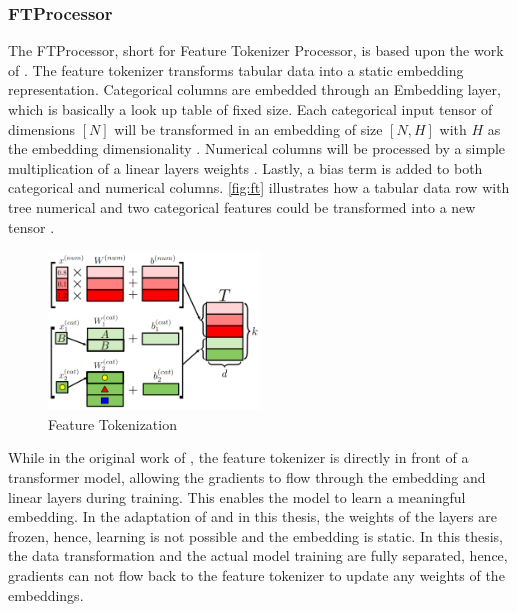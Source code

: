 \subsubsection*{FTProcessor}
\label{ch:FTProcessor}

The FTProcessor, short for Feature Tokenizer Processor, is based upon the work of \cite{zheng2022DiffusionModelsMissing, gorishniy2021RevisitingDeepLearning}.
The feature tokenizer transforms tabular data into a static embedding representation.
Categorical columns are embedded through an Embedding layer, which is basically a look up table \cite{EmbeddingPyTorch13} of fixed size.
Each categorical input tensor of dimensions $[N]$ will be transformed in an embedding of size $[N,H]$ with $H$ as the embedding dimensionality \cite{gorishniy2021RevisitingDeepLearning}.
Numerical columns will be processed by a simple multiplication of a linear layers weights \cite{gorishniy2021RevisitingDeepLearning}.
Lastly, a bias term is added to both categorical and numerical columns.
\autoref{fig:ft} illustrates how a tabular data row with tree numerical and two categorical features could be transformed into a new tensor \cite[Figure 2a, p.4]{gorishniy2021RevisitingDeepLearning}.

\begin{figure}[h]
	\centering
	\includegraphics[width=0.5\textwidth]{images/ft.png}
	\caption{Feature Tokenization \cite[Figure 2a, p.4]{gorishniy2021RevisitingDeepLearning}}
	\label{fig:ft}
\end{figure}

While in the original work of \cite{gorishniy2021RevisitingDeepLearning}, the feature tokenizer is directly in front of a transformer model, allowing the gradients to flow through the embedding and linear layers during training.
This enables the model to learn a meaningful embedding.
In the adaptation of \cite{2023DiffusionModelsMissing} and in this thesis, the weights of the layers are frozen, hence, learning is not possible and the embedding is static.
In this thesis, the data transformation and the actual model training are fully separated, hence, gradients can not flow back to the feature tokenizer to update any weights of the embeddings.


